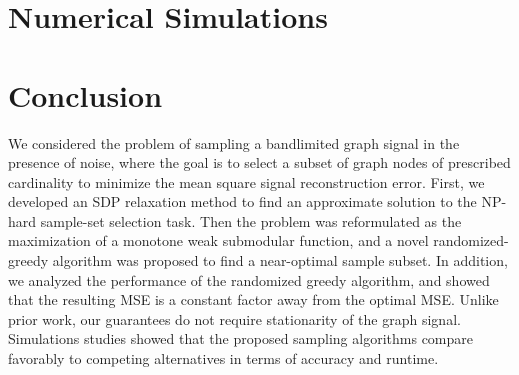 \documentclass{article}
\begin{document}
\section{Numerical Simulations}\label{sec:sim}

\vspace{-0.2cm}
\section{Conclusion} \label{sec:concl}
We considered the problem of sampling a bandlimited graph signal in the presence of noise, where the goal is to select a subset of graph nodes of prescribed cardinality to minimize the mean square signal reconstruction error. First, we developed an SDP relaxation method to find an approximate solution to the NP-hard sample-set selection task. 
Then  the problem was reformulated as the maximization of a monotone weak submodular function, and a novel randomized-greedy algorithm was proposed to find a near-optimal sample subset. In addition, we analyzed the performance of the randomized greedy algorithm, and showed that the resulting MSE is a constant factor away from the optimal MSE. Unlike prior work, our guarantees do not require stationarity of the graph signal. Simulations studies showed that the proposed sampling algorithms compare favorably to competing alternatives in terms of accuracy and runtime.


\clearpage
\newpage


\end{document}
